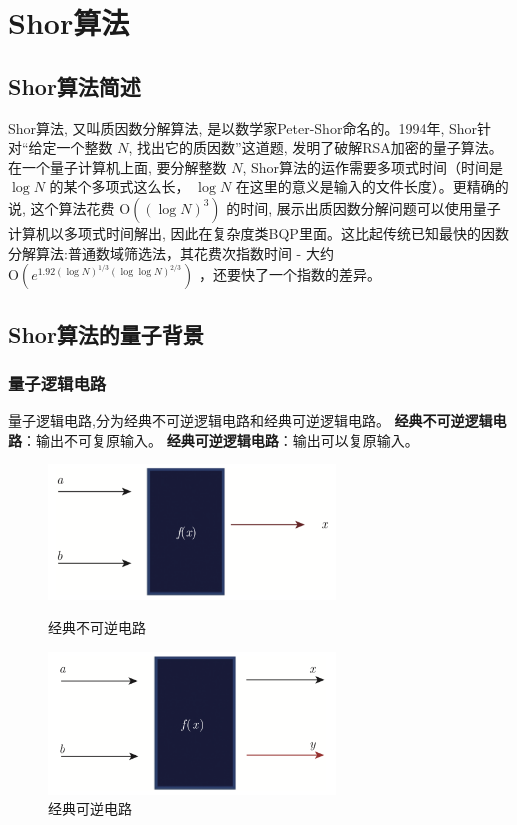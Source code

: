 \documentclass[12pt,hyperref,a4paper,UTF8]{ctexart}
\begin{document}
\newpage
\section{Shor算法}
\subsection{Shor算法简述}
Shor算法, 又叫质因数分解算法, 是以数学家Peter-Shor命名的。1994年, Shor针对“给定一个整数 $N$, 找出它的质因数”这道题, 发明了破解RSA加密的量子算法。在一个量子计算机上面, 要分解整数 $N$, Shor算法的运作需要多项式时间（时间是 $\log N$ 的某个多项式这么长， $\log N$ 在这里的意义是输入的文件长度）。更精确的说, 这个算法花费 $\mathrm{O}\left((\log N)^3\right)$ 的时间, 展示出质因数分解问题可以使用量子计算机以多项式时间解出, 因此在复杂度类BQP里面。这比起传统已知最快的因数分解算法:普通数域筛选法，其花费次指数时间 - 大约 $\mathrm{O}\left(e^{1.92(\log N)^{1 / 3}(\log \log N)^{2 / 3}}\right)$ ，还要快了一个指数的差异。

\subsection{Shor算法的量子背景}
\subsubsection{量子逻辑电路}
量子逻辑电路,分为经典不可逆逻辑电路和经典可逆逻辑电路。
\vskip 8pt
\textbf{经典不可逆逻辑电路}：输出不可复原输入。
\vskip 3pt
\textbf{经典可逆逻辑电路}：输出可以复原输入。

\begin{figure}[!htbp]
	\begin{minipage}{0.5\linewidth}
		\centering
		\includegraphics[width=3in]{figures/经典不可逆逻辑电路.png}
		\caption{经典不可逆电路}
	\end{minipage}
	\begin{minipage}{0.5\linewidth}
		\centering
		\includegraphics[width=3in]{figures/经典可逆逻辑电路.png}
		\caption{经典可逆电路}
	\end{minipage}
\end{figure}
\end{document}

